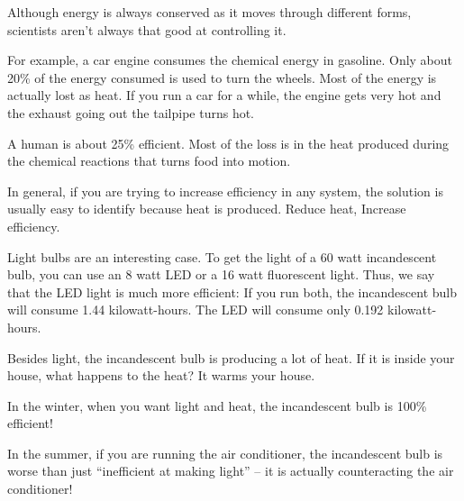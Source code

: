 Although energy is always conserved as it moves through different
forms, scientists aren't always that good at controlling it.

For example, a car engine consumes the chemical energy in gasoline. Only
about 20\% of the energy consumed is used to turn the wheels.  Most of
the energy is actually lost as heat. If you run a car for a while, the engine
gets very hot and the exhaust going out the tailpipe turns hot.

A human is about 25\% efficient. Most of the loss is in the heat produced
during the chemical reactions that turns food into motion.
 
In general, if you are trying to increase efficiency in any system,
the solution is usually easy to identify because heat is produced. Reduce heat, Increase efficiency.

Light bulbs are an interesting case. To get the light of a 60 watt
incandescent bulb, you can use an 8 watt LED or a 16 watt fluorescent
light. Thus, we say that the LED light is much more efficient: If you
run both, the incandescent bulb will consume 1.44 kilowatt-hours. The
LED will consume only 0.192 kilowatt-hours.

Besides light, the incandescent bulb is producing a lot of heat. If it
is inside your house, what happens to the heat? It warms your house.

In the winter, when you want light and heat, the incandescent bulb is
100\% efficient!

In the summer, if you are running the air conditioner, the
incandescent bulb is worse than just ``inefficient at making light'' --
it is actually counteracting the air conditioner! 

